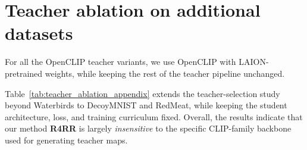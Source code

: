 \documentclass[10pt,twocolumn,letterpaper]{article}
\begin{document}
\section{Teacher ablation on additional datasets}\label{appendix:vlmablation}

For all the OpenCLIP teacher variants, we use OpenCLIP with LAION-pretrained weights, while keeping the rest of the teacher pipeline unchanged.

\begin{table}[h]
\caption{Teacher ablation on DecoyMNIST and RedMeat dataset: VLM and refinement backbones while keeping the student, loss, and curriculum fixed. Results are accuracy (mean$\pm$std). Higher is better.}
\label{tab:teacher_ablation_appendix}
\end{table}



Table~\ref{tab:teacher_ablation_appendix} extends the teacher-selection study beyond Waterbirds to DecoyMNIST and RedMeat, while keeping the student architecture, loss, and training curriculum fixed. Overall, the results indicate that our method \textbf{R4RR} is largely \emph{insensitive} to the specific CLIP-family backbone used for generating teacher maps.
\end{document}
